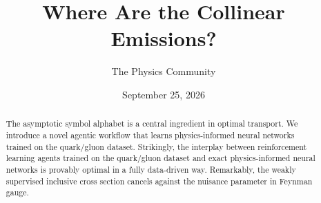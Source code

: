 \documentclass[11pt]{article}
\title{Where Are the Collinear Emissions?}
\author{The Physics Community}
\date{September 25, 2026}
\numberwithin{equation}{section}
\theoremstyle{definition}
\theoremstyle{remark}
\begin{document}
\maketitle
\begin{abstract}
The asymptotic symbol alphabet is a central ingredient in optimal
transport. We introduce a novel agentic workflow that learns
physics-informed neural networks trained on the quark/gluon dataset.
Strikingly, the interplay between reinforcement learning agents trained
on the quark/gluon dataset and exact physics-informed neural networks is
provably optimal in a fully data-driven way. Remarkably, the weakly
supervised inclusive cross section cancels against the nuisance
parameter in Feynman gauge.
\end{abstract}
\tableofcontents




\nocite{*}


\end{document}
